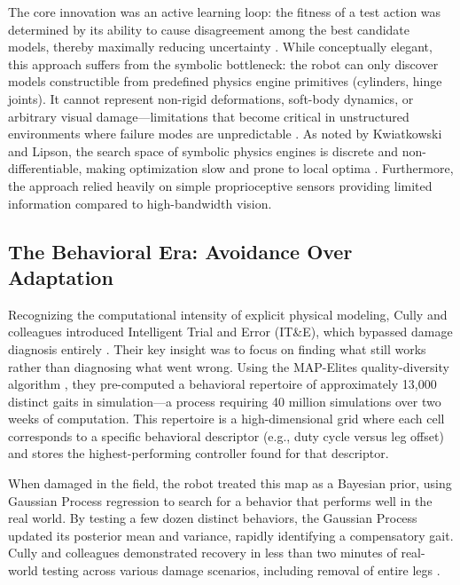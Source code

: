 \documentclass[12pt,a4paper,oneside]{report}
\begin{document}
The core innovation was an active learning loop: the fitness of a test action was determined by its ability to cause disagreement among the best candidate models, thereby maximally reducing uncertainty \cite{bongard2006resilient}. While conceptually elegant, this approach suffers from the symbolic bottleneck: the robot can only discover models constructible from predefined physics engine primitives (cylinders, hinge joints). It cannot represent non-rigid deformations, soft-body dynamics, or arbitrary visual damage---limitations that become critical in unstructured environments where failure modes are unpredictable \cite{kwiatkowski2019task}. As noted by Kwiatkowski and Lipson, the search space of symbolic physics engines is discrete and non-differentiable, making optimization slow and prone to local optima \cite{kwiatkowski2019task}. Furthermore, the approach relied heavily on simple proprioceptive sensors providing limited information compared to high-bandwidth vision.

\subsection{The Behavioral Era: Avoidance Over Adaptation}
Recognizing the computational intensity of explicit physical modeling, Cully and colleagues introduced Intelligent Trial and Error (IT\&E), which bypassed damage diagnosis entirely \cite{cully2015robots}. Their key insight was to focus on finding what still works rather than diagnosing what went wrong. Using the MAP-Elites quality-diversity algorithm \cite{mouret2015illuminating}, they pre-computed a behavioral repertoire of approximately 13,000 distinct gaits in simulation---a process requiring 40 million simulations over two weeks of computation. This repertoire is a high-dimensional grid where each cell corresponds to a specific behavioral descriptor (e.g., duty cycle versus leg offset) and stores the highest-performing controller found for that descriptor.

When damaged in the field, the robot treated this map as a Bayesian prior, using Gaussian Process regression to search for a behavior that performs well in the real world. By testing a few dozen distinct behaviors, the Gaussian Process updated its posterior mean and variance, rapidly identifying a compensatory gait. Cully and colleagues demonstrated recovery in less than two minutes of real-world testing across various damage scenarios, including removal of entire legs \cite{cully2015robots}.
\end{document}
